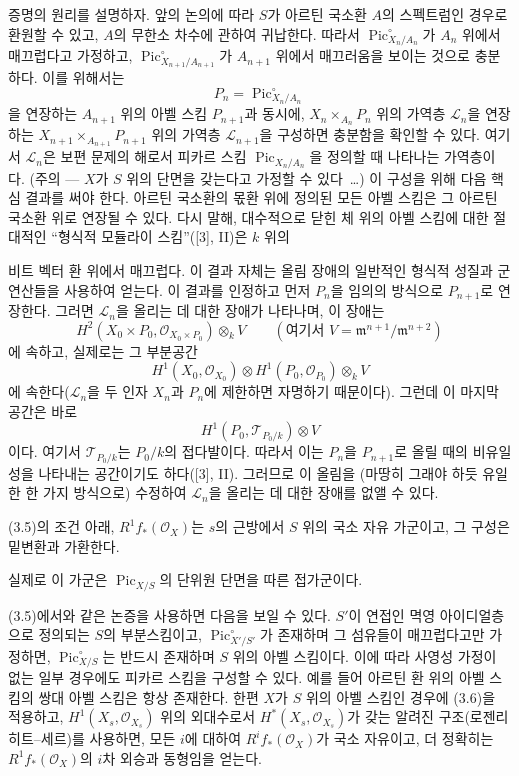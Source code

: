 증명의 원리를 설명하자. 앞의 논의에 따라 $S$가 아르틴 국소환 $A$의
스펙트럼인 경우로 환원할 수 있고, $A$의 무한소 차수에 관하여 귀납한다.
따라서 $\operatorname{Pic}_{X_n/A_n}^\circ$가 $A_n$ 위에서 매끄럽다고
가정하고, $\operatorname{Pic}_{X_{n+1}/A_{n+1}}^\circ$가 $A_{n+1}$ 위에서
매끄러움을 보이는 것으로 충분하다. 이를 위해서는
\[
P_n=\operatorname{Pic}_{X_n/A_n}^\circ
\]
을 연장하는 $A_{n+1}$ 위의 아벨 스킴 $P_{n+1}$과 동시에,
$X_n\times_{A_n}P_n$ 위의 가역층 $\mathcal L_n$을 연장하는
$X_{n+1}\times_{A_{n+1}}P_{n+1}$ 위의 가역층 $\mathcal L_{n+1}$을
구성하면 충분함을 확인할 수 있다. 여기서 $\mathcal L_n$은 보편 문제의
해로서 피카르 스킴 $\operatorname{Pic}_{X_n/A_n}$을 정의할 때 나타나는
가역층이다. (주의 --- $X$가 $S$ 위의 단면을 갖는다고 가정할 수 있다~\ldots)
이 구성을 위해 다음 핵심 결과를 써야 한다. 아르틴 국소환의 몫환 위에
정의된 모든 아벨 스킴은 그 아르틴 국소환 위로 연장될 수 있다. 다시 말해,
대수적으로 닫힌 체 위의 아벨 스킴에 대한 절대적인 ``형식적 모듈라이
스킴''([3], II)은 $k$ 위의

비트 벡터 환 위에서 매끄럽다. 이 결과 자체는
올림 장애의 일반적인 형식적 성질과 군 연산들을 사용하여 얻는다. 이 결과를
인정하고 먼저 $P_n$을 임의의 방식으로 $P_{n+1}$로 연장한다. 그러면
$\mathcal L_n$을 올리는 데 대한 장애가 나타나며, 이 장애는
\[
H^2(X_0\times P_0,\mathcal O_{X_0\times P_0})\otimes_k V
\qquad(\text{여기서 }V=\mathfrak m^{n+1}/\mathfrak m^{n+2})
\]
에 속하고, 실제로는 그 부분공간
\[
H^1(X_0,\mathcal O_{X_0})\otimes
H^1(P_0,\mathcal O_{P_0})\otimes_k V
\]
에 속한다($\mathcal L_n$을 두 인자 $X_n$과 $P_n$에 제한하면 자명하기
때문이다). 그런데 이 마지막 공간은 바로
\[
H^1(P_0,\mathcal T_{P_0/k})\otimes V
\]
이다. 여기서 $\mathcal T_{P_0/k}$는 $P_0/k$의 접다발이다. 따라서 이는
$P_n$을 $P_{n+1}$로 올릴 때의 비유일성을 나타내는 공간이기도 하다([3],
II). 그러므로 이 올림을 (마땅히 그래야 하듯 유일한 한 가지 방식으로)
수정하여 $\mathcal L_n$을 올리는 데 대한 장애를 없앨 수 있다.

 (3.5)의 조건 아래,
$R^1f_*(\mathcal O_X)$는 $s$의 근방에서 $S$ 위의 국소 자유 가군이고,
그 구성은 밑변환과 가환한다.

실제로 이 가군은 $\operatorname{Pic}_{X/S}$의 단위원 단면을 따른
접가군이다.

 (3.5)에서와 같은 논증을 사용하면 다음을 보일 수 있다.
$S'$이 연접인 멱영 아이디얼층으로 정의되는 $S$의 부분스킴이고,
$\operatorname{Pic}_{X'/S'}^\circ$가 존재하며 그 섬유들이 매끄럽다고만
가정하면, $\operatorname{Pic}_{X/S}^\circ$는 반드시 존재하며 $S$ 위의
아벨 스킴이다. 이에 따라 사영성 가정이 없는 일부 경우에도 피카르 스킴을
구성할 수 있다. 예를 들어 아르틴 환 위의 아벨 스킴의 쌍대 아벨 스킴은
항상 존재한다. 한편 $X$가 $S$ 위의 아벨 스킴인 경우에 (3.6)을 적용하고,
$H^1(X_s,\mathcal O_{X_s})$ 위의 외대수로서
$H^*(X_s,\mathcal O_{X_s})$가 갖는 알려진 구조(로젠리히트--세르)를
사용하면, 모든 $i$에 대하여 $R^if_*(\mathcal O_X)$가 국소 자유이고,
더 정확히는 $R^1f_*(\mathcal O_X)$의 $i$차 외승과 동형임을 얻는다.

